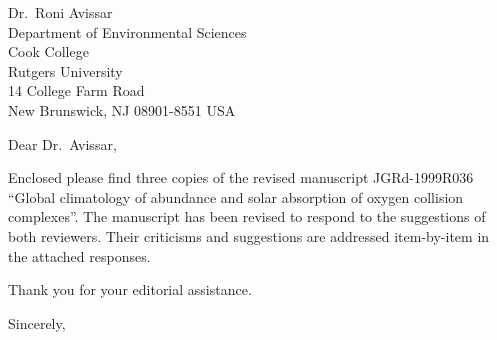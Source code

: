 \documentclass[12pt,twoside]{ncarletter}
\date{July~11, 1999} %
\begin{document}
\begin{letter}{%
Dr.~Roni Avissar\\
Department of Environmental Sciences\\
Cook College\\
Rutgers University\\
14 College Farm Road\\
New Brunswick, NJ 08901-8551 USA}

\opening{Dear Dr.~Avissar,}
\enlargethispage*{0.25in} 

Enclosed please find three copies of the revised manuscript
JGRd-1999R036 ``Global climatology of abundance and solar absorption
of oxygen collision complexes''.
The manuscript has been revised to respond to the suggestions
of both reviewers.  
Their criticisms and suggestions are addressed item-by-item in the
attached responses. 

Thank you for your editorial assistance.

\closing{Sincerely,}


\end{letter}
\end{document}
